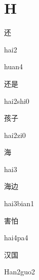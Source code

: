 ﻿%
\section*{H}

\begin{verbete}[hai2]{还}
\begin{pronuncia}{hai2}
\end{pronuncia}
\begin{pronuncia}{huan4}
\end{pronuncia}
\end{verbete}

\begin{verbete}{还是}
\begin{pronuncia}{hai2shi0}
\end{pronuncia}
\end{verbete}

\begin{verbete}[hai2zi0]{孩子}
\begin{pronuncia}{hai2zi0}
\end{pronuncia}
\end{verbete}

\begin{verbete}[hai3]{海}
\begin{pronuncia}{hai3}
\end{pronuncia}
\end{verbete}

\begin{verbete}{海边}
\begin{pronuncia}{hai3bian1}
\end{pronuncia}
\end{verbete}

\begin{verbete}[hai4pa4]{害怕}
\begin{pronuncia}{hai4pa4}
\end{pronuncia}
\end{verbete}

\begin{verbete}{汉国}
\begin{pronuncia}{Han2guo2}
\end{pronuncia}
\end{verbete}


